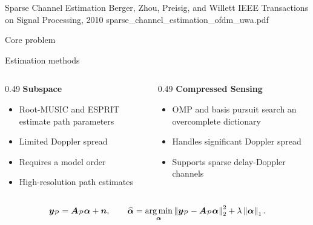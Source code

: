\documentclass[aspectratio=169,10pt]{beamer}
\begin{document}
\papercover
  {Sparse Channel Estimation}
  {Berger, Zhou, Preisig, and Willett}
  {IEEE Transactions on Signal Processing, 2010}
  {sparse_channel_estimation_ofdm_uwa.pdf}

\begin{frame}{Core problem}
\end{frame}

\begin{frame}{Estimation methods}
\begin{columns}[T,onlytextwidth]
\begin{column}{0.49\textwidth}
\textbf{\color{accentblue}Subspace}
\begin{itemize}\setlength{\itemsep}{0.35em}
  \item Root-MUSIC and ESPRIT estimate path parameters
  \item Limited Doppler spread
  \item Requires a model order
  \item High-resolution path estimates
\end{itemize}
\end{column}
\begin{column}{0.49\textwidth}
\textbf{\color{accentgreen}Compressed Sensing}
\begin{itemize}\setlength{\itemsep}{0.35em}
  \item OMP and basis pursuit search an overcomplete dictionary
  \item Handles significant Doppler spread
  \item Supports sparse delay-Doppler channels
\end{itemize}
\end{column}
\end{columns}
\[
  \bm{y}_{\mathcal P}=\bm{A}_{\mathcal P}\bm{\alpha}+\bm{n},
  \qquad
  \widehat{\bm{\alpha}}
  =
  \operatorname*{arg\,min}_{\bm{\alpha}}\left\lVert \bm{y}_{\mathcal P}-\bm{A}_{\mathcal P}\bm{\alpha}\right\rVert_2^2
  +\lambda\left\lVert \bm{\alpha}\right\rVert_1 .
\]
\end{frame}
\end{document}
